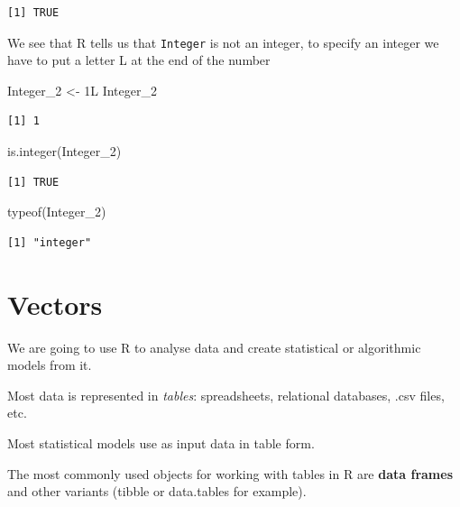 \documentclass[
  letterpaper,
  DIV=11,
  numbers=noendperiod]{scrartcl}
\newenvironment{Shaded}{\begin{snugshade}}{\end{snugshade}}
\newcommand{\FunctionTok}[1]{\textcolor[rgb]{0.28,0.35,0.67}{#1}}
\newcommand{\NormalTok}[1]{\textcolor[rgb]{0.00,0.23,0.31}{#1}}
\newcommand{\OtherTok}[1]{\textcolor[rgb]{0.00,0.23,0.31}{#1}}
\begin{document}
\begin{verbatim}
[1] TRUE
\end{verbatim}

We see that R tells us that \texttt{Integer} is not an integer, to
specify an integer we have to put a letter L at the end of the number

\begin{Shaded}
\begin{Highlighting}[]
\NormalTok{Integer\_2 }\OtherTok{\textless{}{-}}\NormalTok{ 1L}
\NormalTok{Integer\_2}
\end{Highlighting}
\end{Shaded}

\begin{verbatim}
[1] 1
\end{verbatim}

\begin{Shaded}
\begin{Highlighting}[]
\FunctionTok{is.integer}\NormalTok{(Integer\_2)}
\end{Highlighting}
\end{Shaded}

\begin{verbatim}
[1] TRUE
\end{verbatim}

\begin{Shaded}
\begin{Highlighting}[]
\FunctionTok{typeof}\NormalTok{(Integer\_2)}
\end{Highlighting}
\end{Shaded}

\begin{verbatim}
[1] "integer"
\end{verbatim}

\hypertarget{vectors}{%
\section{Vectors}\label{vectors}}

We are going to use R to analyse data and create statistical or
algorithmic models from it.

Most data is represented in \emph{tables}: spreadsheets, relational
databases, .csv files, etc.

Most statistical models use as input data in table form.

The most commonly used objects for working with tables in R are
\textbf{data frames} and other variants (tibble or data.tables for
example).
\end{document}
